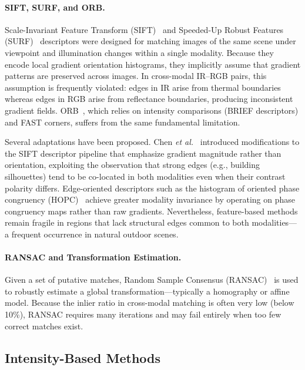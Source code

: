 \paragraph{SIFT, SURF, and ORB.}
Scale-Invariant Feature Transform (SIFT)~\cite{lowe2004distinctive} and
Speeded-Up Robust Features (SURF)~\cite{bay2008speeded} descriptors were
designed for matching images of the same scene under viewpoint and illumination
changes within a single modality. Because they encode local gradient
orientation histograms, they implicitly assume that gradient patterns are
preserved across images. In cross-modal IR--RGB pairs, this assumption is
frequently violated: edges in IR arise from thermal boundaries whereas edges in
RGB arise from reflectance boundaries, producing inconsistent gradient fields.
ORB~\cite{rublee2011orb}, which relies on intensity comparisons (BRIEF
descriptors) and FAST corners, suffers from the same fundamental limitation.

Several adaptations have been proposed. Chen \textit{et al.}~\cite{chen2022infrared}
introduced modifications to the SIFT descriptor pipeline that emphasize
gradient magnitude rather than orientation, exploiting the observation that
strong edges (e.g., building silhouettes) tend to be co-located in both
modalities even when their contrast polarity differs. Edge-oriented
descriptors such as the histogram of oriented phase congruency
(HOPC)~\cite{ye2017robust} achieve greater modality invariance by operating on
phase congruency maps rather than raw gradients. Nevertheless, feature-based
methods remain fragile in regions that lack structural edges common to both
modalities---a frequent occurrence in natural outdoor scenes.

\paragraph{RANSAC and Transformation Estimation.}
Given a set of putative matches, Random Sample Consensus
(RANSAC)~\cite{fischler1981random} is used to robustly estimate a global
transformation---typically a homography or affine model. Because the inlier
ratio in cross-modal matching is often very low (below 10\%), RANSAC requires
many iterations and may fail entirely when too few correct matches exist.

\subsection{Intensity-Based Methods}
\label{subsec:intensity-based}

